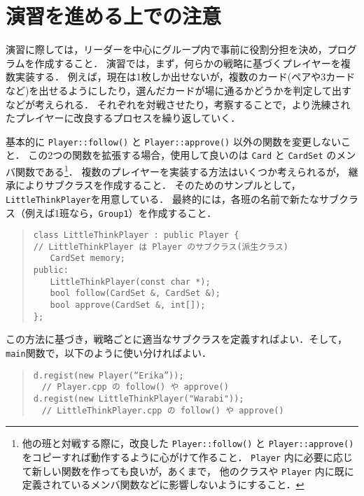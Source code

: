 \section*{演習を進める上での注意}
演習に際しては，リーダーを中心にグループ内で事前に役割分担を決め，プログラムを作成すること．
演習では，まず，何らかの戦略に基づくプレイヤーを複数実装する．
例えば，現在は1枚しか出せないが，複数のカード(ペアや3カードなど)を出せるようにしたり，選んだカードが場に通るかどうかを判定して出すなどが考えられる．
それぞれを対戦させたり，考察することで，より洗練されたプレイヤーに改良するプロセスを繰り返していく．

基本的に \verb+Player::follow()+ と \verb+Player::approve()+ 以外の関数を変更しないこと．
この2つの関数を拡張する場合，使用して良いのは \verb+Card+ と  \verb+CardSet+ のメンバ関数である\footnote{他の班と対戦する際に，改良した \verb+Player::follow()+ と \verb+Player::approve()+ をコピーすれば動作するように心がけて作ること． \verb+Player+ 内に必要に応じて新しい関数を作っても良いが，あくまで， 他のクラスや \verb+Player+ 内に既に定義されているメンバ関数などに影響しないようにすること．}．
複数のプレイヤーを実装する方法はいくつか考えられるが，
継承によりサブクラスを作成すること．
そのためのサンプルとして，\verb+LittleThinkPlayer+を用意している．
最終的には，各班の名前で新たなサブクラス（例えば1班なら，\verb+Group1+）を作成すること．
\begin{quote}
\begin{verbatim}
class LittleThinkPlayer : public Player {
// LittleThinkPlayer は Player のサブクラス(派生クラス)
　　CardSet memory;
public:
　　LittleThinkPlayer(const char *);
　　bool follow(CardSet &, CardSet &);
　　bool approve(CardSet &, int[]);
};
\end{verbatim}
\end{quote}
この方法に基づき，戦略ごとに適当なサブクラスを定義すればよい．そして，\verb+main+関数で，以下のように使い分ければよい．
\begin{quote}
\begin{verbatim}
d.regist(new Player(“Erika”)); 　
　// Player.cpp の follow() や approve() 
d.regist(new LittleThinkPlayer("Warabi")); 
　// LittleThinkPlayer.cpp の follow() や approve() 
\end{verbatim}
\end{quote}

